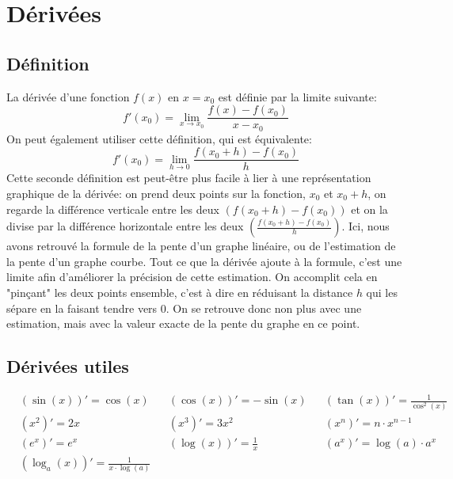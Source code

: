 \documentclass{article}
\begin{document}

\section{Dérivées}

\subsection{Définition}
La dérivée d'une fonction \(f(x)\) en \(x=x_0\) est définie par la limite suivante:
\begin{equation*}
	f'(x_0) = \lim_{x \to x_0} \dfrac{f(x) - f(x_0)}{x - x_0}
\end{equation*}
On peut également utiliser cette définition, qui est équivalente:
\begin{equation*}
	f'(x_0) = \lim_{h \to 0} \dfrac{f(x_0 + h) - f(x_0)}{h}
\end{equation*}
Cette seconde définition est peut-être plus facile à lier à une représentation graphique de la dérivée: on prend deux points sur la fonction, \(x_0\) et \(x_0 + h\), on regarde la différence verticale entre les deux \(\left (f(x_0 + h) - f(x_0)\right )\) et on la divise par la différence horizontale entre les deux \(\left (\frac{f(x_0 + h) - f(x_0)}{h}\right )\). Ici, nous avons retrouvé la formule de la pente d'un graphe linéaire, ou de l'estimation de la pente d'un graphe courbe. Tout ce que la dérivée ajoute à la formule, c'est une limite afin d'améliorer la précision de cette estimation. On accomplit cela en "pinçant" les deux points ensemble, c'est à dire en réduisant la distance \(h\) qui les sépare en la faisant tendre vers 0. On se retrouve donc non plus avec une estimation, mais avec la valeur exacte de la pente du graphe en ce point.

\subsection{Dérivées utiles}
\begin{align*}
	&(\sin(x))' = \cos(x)
		& &(\cos(x))' = -\sin(x)
			& &(\tan(x))' = \frac{1}{\cos^2(x)} \\
	&(x^2)' = 2x
		& &(x^3)' = 3x^2
			& &(x^n)' = n \cdot x^{n-1} \\
	&(e^x)' = e^x
		& &(\log(x))' = \frac1x
			& &(a^x)' = \log(a) \cdot a^x \\
	&(\log_a(x))' = \frac{1}{x \cdot \log(a)}
\end{align*}
\end{document}
